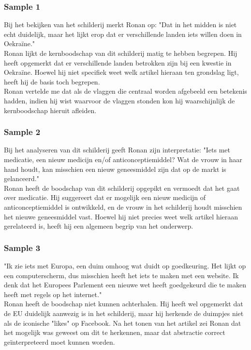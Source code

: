 \subsubsection{Sample 1}
Bij het bekijken van het schilderij merkt Ronan op: "Dat in het midden is niet echt duidelijk, maar het lijkt erop dat er verschillende landen iets willen doen in Oekraïne." \\

Ronan lijkt de kernboodschap van dit schilderij matig te hebben begrepen. Hij heeft opgemerkt dat er verschillende landen betrokken zijn bij een kwestie in Oekraïne. Hoewel hij niet specifiek weet welk artikel hieraan ten grondslag ligt, heeft hij de basis toch begrepen.  \\

Ronan vertelde me dat als de vlaggen die centraal worden afgebeeld een betekenis hadden, indien hij wist waarvoor de vlaggen stonden kon hij waarschijnlijk de kernboodschap hieruit afleiden. 

\subsubsection{Sample 2}
Bij het analyseren van dit schilderij geeft Ronan zijn interpretatie: "Iets met medicatie, een nieuw medicijn en/of anticonceptiemiddel? Wat de vrouw in haar hand houdt, kan misschien een nieuw geneesmiddel zijn dat op de markt is gelanceerd." \\

Ronan heeft de boodschap van dit schilderij opgepikt en vermoedt dat het gaat over medicatie. Hij suggereert dat er mogelijk een nieuw medicijn of anticonceptiemiddel is ontwikkeld, en de vrouw in het schilderij houdt misschien het nieuwe geneesmiddel vast. Hoewel hij niet precies weet welk artikel hieraan gerelateerd is, heeft hij een algemeen begrip van het onderwerp. \\

\subsubsection{Sample 3}
"Ik zie iets met Europa, een duim omhoog wat duidt op goedkeuring. Het lijkt op een computerscherm, dus misschien heeft het iets te maken met een website. Ik denk dat het Europees Parlement een nieuwe wet heeft goedgekeurd die te maken heeft met regels op het internet." \\

Ronan heeft de boodschap niet kunnen achterhalen. Hij heeft wel opgemerkt dat de EU duidelijk aanwezig is in het schilderij, maar hij herkende de duimpjes niet als de iconische "likes" op Facebook. Na het tonen van het artikel zei Ronan dat het mogelijk was geweest om dit te herkennen, maar dat abstractie correct geïnterpreteerd moet kunnen worden.

